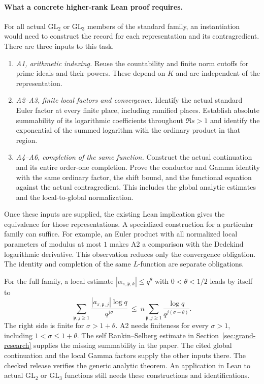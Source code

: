 \documentclass[11pt]{amsart}
\theoremstyle{definition}
\theoremstyle{remark}
\numberwithin{equation}{section}
\begin{document}
\paragraph{What a concrete higher-rank Lean proof requires.}
For all actual \(\mathrm{GL}_2\) or \(\mathrm{GL}_3\) members of
the standard family, an instantiation would need to construct
the record for each representation and its contragredient.
There are three inputs to this task.
\begin{enumerate}[label=\textup{(\roman*)},itemsep=.15em]
\item \emph{A1, arithmetic indexing.} Reuse the countability
and finite norm cutoffs for prime ideals and their powers.
These depend on \(K\) and are independent of the representation.
\item \emph{A2--A3, finite local factors and convergence.}
Identify the actual standard Euler factor at every finite
place, including ramified places. Establish absolute
summability of its logarithmic coefficients throughout
\(\Re s>1\) and identify the exponential of the summed
logarithm with the ordinary product in that region.
\item \emph{A4--A6, completion of the same function.}
Construct the actual continuation and its entire order-one
completion. Prove the conductor and Gamma identity with the
same ordinary factor, the shift bound, and the functional
equation against the actual contragredient. This includes the
global analytic estimates and the local-to-global normalization.
\end{enumerate}
Once these inputs are supplied, the existing Lean implication
gives the equivalence for those representations. A specialized
construction for a particular family can suffice. For example, an
Euler product with all normalized local parameters of modulus at
most \(1\) makes A2 a comparison with the Dedekind logarithmic
derivative. This observation reduces only the convergence
obligation. The identity and completion of the same \(L\)-function
are separate obligations.

For the full family, a local estimate
\(|\alpha_{\pi,\mathfrak p,k}|\le q^\theta\) with
\(0<\theta<1/2\) leads by itself to
\[
 \sum_{\mathfrak p,j\ge1}
  \frac{|a_{\pi,\mathfrak p,j}|\log q}{q^{j\sigma}}
 \ \leq\ n\sum_{\mathfrak p,j\ge1}
            \frac{\log q}{q^{j(\sigma-\theta)}} .
\]
The right side is finite for \(\sigma>1+\theta\). A2 needs
finiteness for every \(\sigma>1\), including
\(1<\sigma\le1+\theta\). The self Rankin--Selberg estimate
in Section~\ref{sec:grand-research} supplies the missing
summability in the paper. The cited global continuation
and the local Gamma factors supply the other inputs there.
The checked release verifies the generic analytic theorem.
An application in Lean to actual \(\mathrm{GL}_2\) or
\(\mathrm{GL}_3\) functions still needs these constructions
and identifications.
\end{document}
